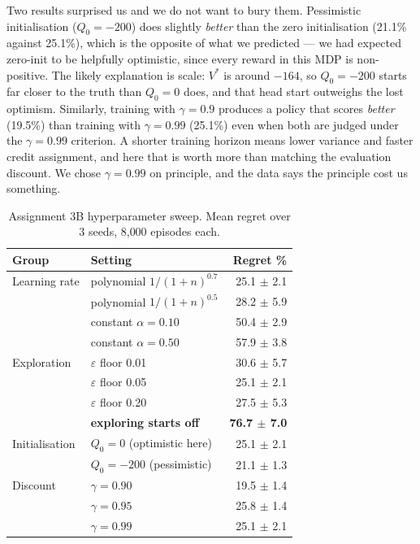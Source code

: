\documentclass{ai-lab-report}
\begin{document}
Two results surprised us and we do not want to bury them. Pessimistic initialisation
($Q_0 = -200$) does slightly \emph{better} than the zero initialisation (21.1\% against 25.1\%),
which is the opposite of what we predicted --- we had expected zero-init to be helpfully
optimistic, since every reward in this MDP is non-positive. The likely explanation is scale:
$V^*$ is around $-164$, so $Q_0 = -200$ starts far closer to the truth than $Q_0 = 0$ does, and
that head start outweighs the lost optimism. Similarly, training with $\gamma = 0.9$ produces a
policy that scores \emph{better} (19.5\%) than training with $\gamma = 0.99$ (25.1\%) even when
both are judged under the $\gamma = 0.99$ criterion. A shorter training horizon means lower
variance and faster credit assignment, and here that is worth more than matching the evaluation
discount. We chose $\gamma = 0.99$ on principle, and the data says the principle cost us
something.

\begin{table}[H]
\centering
\caption{Assignment 3B hyperparameter sweep. Mean regret over 3 seeds, 8{,}000 episodes each.}
\label{tab:a3hp}
\begin{tabular}{llr}
\toprule
Group & Setting & Regret \% \\
\midrule
Learning rate  & polynomial $1/(1+n)^{0.7}$ & 25.1 $\pm$ 2.1 \\
               & polynomial $1/(1+n)^{0.5}$ & 28.2 $\pm$ 5.9 \\
               & constant $\alpha = 0.10$   & 50.4 $\pm$ 2.9 \\
               & constant $\alpha = 0.50$   & 57.9 $\pm$ 3.8 \\
\midrule
Exploration    & $\varepsilon$ floor 0.01   & 30.6 $\pm$ 5.7 \\
               & $\varepsilon$ floor 0.05   & 25.1 $\pm$ 2.1 \\
               & $\varepsilon$ floor 0.20   & 27.5 $\pm$ 5.3 \\
               & \textbf{exploring starts off} & \textbf{76.7 $\pm$ 7.0} \\
\midrule
Initialisation & $Q_0 = 0$ (optimistic here) & 25.1 $\pm$ 2.1 \\
               & $Q_0 = -200$ (pessimistic)  & 21.1 $\pm$ 1.3 \\
\midrule
Discount       & $\gamma = 0.90$ & 19.5 $\pm$ 1.4 \\
               & $\gamma = 0.95$ & 25.8 $\pm$ 1.4 \\
               & $\gamma = 0.99$ & 25.1 $\pm$ 2.1 \\
\bottomrule
\end{tabular}
\end{table}
\end{document}

